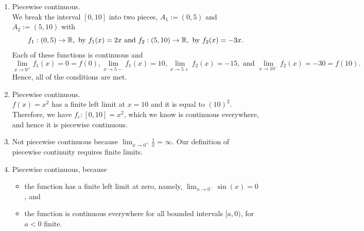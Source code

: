 \begin{enumerate}
\renewcommand{\labelenumi}{(\alph{enumi})}
\setlength{\itemsep}{.2cm}
    \item \Ans Piecewise continuous.\\ 

    We break the interval $[0, 10]$ into two pieces, $A_1:=(0, 5)$ and $A_2:=(5, 10)$ with
    $$ f_1:(0, 5) \to \mathbb R, \text{ by } f_1(x) = 2 x \text{ and } f_2:(5, 10) \to \mathbb R, \text{ by } f_2(x) = -3 x.$$
    Each of these functions is continuous and 
    $$\displaystyle \lim_{x \to 0^+} f_1(x) = 0=f(0),  \lim_{x \to 5-} f_1(x) = 10, \lim_{x \to 5+} f_2(x) = -15, \text{ and } \lim_{x \to 10^-} f_2(x) = -30 = f(10).$$
    Hence, all of the conditions are met.

    \item \Ans Piecewise continuous. \\
    
    $f(x) = x^2$ has a finite left limit at $x=10$ and it is equal to $(10)^2$. Therefore, we have $f_e:[0, 10] = x^2$, which we know is continuous everywhere, and hence it is piecewise continuous. 
    
    \item  \Ans Not piecewise continuous because $\displaystyle \lim_{x \to 0^+} \frac{1}{x} = \infty$. Our definition of piecewise continuity requires finite limits.
    
    \item \Ans Piecewise continuous, because
    \begin{itemize}
        \item the function has a finite left limit at zero, namely, $\displaystyle \lim_{x \to 0^-}\sin(x) = 0$, and
        \item the function is continuous everywhere for all bounded intervals $[a, 0)$, for $a < 0$ finite.
    \end{itemize}
   
\end{enumerate}
\Qed

\bigskip

